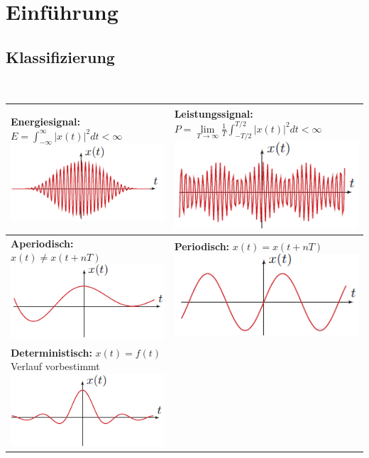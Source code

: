 \section{Einführung}

\subsection{Klassifizierung}\\
\begin{tabular}{C{4.5cm}|C{4.5cm}}
	\textbf{Energiesignal:} $E = \int_{-\infty}^{\infty}|x(t)|^2dt < \infty$
	\includegraphics[width=0.4\columnwidth]{Images/energiesignal}
	& \textbf{Leistungssignal:} $P =\lim\limits_{T\rightarrow\infty}\frac{1}{T}\int_{-T/2}^{T/2}|x(t)|^2dt < \infty$
	\includegraphics[width=0.4\columnwidth]{Images/leistungssignal} \\ \midrule
	\textbf{Aperiodisch:} $x(t) \neq x(t + nT)$
	\includegraphics[width=0.4\columnwidth]{Images/apreiodisch}
	& \textbf{Periodisch:} $x(t) = x(t + nT)$
	\includegraphics[width=0.4\columnwidth]{Images/periodisch} \\ \midrule
	\textbf{Deterministisch:} $x(t) = f(t)$ Verlauf vorbestimmt
	\includegraphics[width=0.4\columnwidth]{Images/deterministisch}

\end{tabular}
